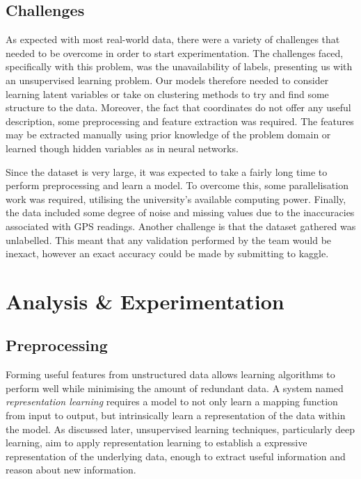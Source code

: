 \documentclass[a4paper, 11pt, twocolumn]{report}
\begin{document}
\subsection{Challenges}

As expected with most real-world data, there were a variety of challenges that needed to be overcome in order to start experimentation.
The challenges faced, specifically with this problem, was the unavailability of labels, presenting us with an unsupervised learning problem.
Our models therefore needed to consider learning latent variables or take on clustering methods to try and find some structure to the data.
Moreover, the fact that coordinates do not offer any useful description, some preprocessing and feature extraction was required.
The features may be extracted manually using prior knowledge of the problem domain or learned though hidden variables as in neural networks.

Since the dataset is very large, it was expected to take a fairly long time to perform preprocessing and learn a model.
To overcome this, some parallelisation work was required, utilising the university's available computing power.
Finally, the data included some degree of noise and missing values due to the inaccuracies associated with GPS readings.
Another challenge is that the dataset gathered was unlabelled. This meant that any validation performed by the team would be inexact, however an exact accuracy could be made by submitting to kaggle.

\section{Analysis \& Experimentation}

\subsection{Preprocessing}

Forming useful features from unstructured data allows learning algorithms to perform well while minimising the amount of redundant data.
A system named \textit{representation learning} requires a model to not only learn a mapping function from input to output, but intrinsically learn a representation of the data within the model.
As discussed later, unsupervised learning techniques, particularly deep learning, aim to apply representation learning to establish a expressive representation of the underlying data, enough to extract useful information and reason about new information.
\end{document}
